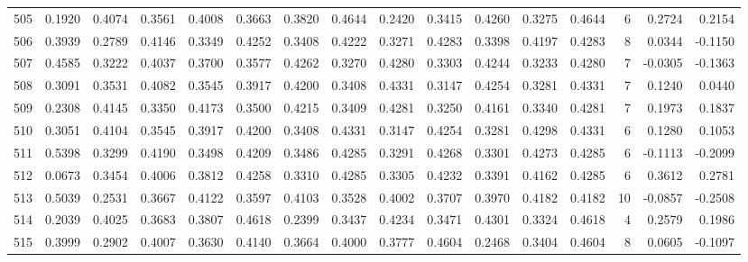 \begin{tabular}{lrrrrrrrrrrrrrrr}
505 &      0.1920 &  0.4074 &  0.3561 &  0.4008 &  0.3663 &  0.3820 &  0.4644 &  0.2420 &  0.3415 &  0.4260 &   0.3275 &     0.4644 &      6 &                    0.2724 &                     0.2154 \\
506 &      0.3939 &  0.2789 &  0.4146 &  0.3349 &  0.4252 &  0.3408 &  0.4222 &  0.3271 &  0.4283 &  0.3398 &   0.4197 &     0.4283 &      8 &                    0.0344 &                    -0.1150 \\
507 &      0.4585 &  0.3222 &  0.4037 &  0.3700 &  0.3577 &  0.4262 &  0.3270 &  0.4280 &  0.3303 &  0.4244 &   0.3233 &     0.4280 &      7 &                   -0.0305 &                    -0.1363 \\
508 &      0.3091 &  0.3531 &  0.4082 &  0.3545 &  0.3917 &  0.4200 &  0.3408 &  0.4331 &  0.3147 &  0.4254 &   0.3281 &     0.4331 &      7 &                    0.1240 &                     0.0440 \\
509 &      0.2308 &  0.4145 &  0.3350 &  0.4173 &  0.3500 &  0.4215 &  0.3409 &  0.4281 &  0.3250 &  0.4161 &   0.3340 &     0.4281 &      7 &                    0.1973 &                     0.1837 \\
510 &      0.3051 &  0.4104 &  0.3545 &  0.3917 &  0.4200 &  0.3408 &  0.4331 &  0.3147 &  0.4254 &  0.3281 &   0.4298 &     0.4331 &      6 &                    0.1280 &                     0.1053 \\
511 &      0.5398 &  0.3299 &  0.4190 &  0.3498 &  0.4209 &  0.3486 &  0.4285 &  0.3291 &  0.4268 &  0.3301 &   0.4273 &     0.4285 &      6 &                   -0.1113 &                    -0.2099 \\
512 &      0.0673 &  0.3454 &  0.4006 &  0.3812 &  0.4258 &  0.3310 &  0.4285 &  0.3305 &  0.4232 &  0.3391 &   0.4162 &     0.4285 &      6 &                    0.3612 &                     0.2781 \\
513 &      0.5039 &  0.2531 &  0.3667 &  0.4122 &  0.3597 &  0.4103 &  0.3528 &  0.4002 &  0.3707 &  0.3970 &   0.4182 &     0.4182 &     10 &                   -0.0857 &                    -0.2508 \\
514 &      0.2039 &  0.4025 &  0.3683 &  0.3807 &  0.4618 &  0.2399 &  0.3437 &  0.4234 &  0.3471 &  0.4301 &   0.3324 &     0.4618 &      4 &                    0.2579 &                     0.1986 \\
515 &      0.3999 &  0.2902 &  0.4007 &  0.3630 &  0.4140 &  0.3664 &  0.4000 &  0.3777 &  0.4604 &  0.2468 &   0.3404 &     0.4604 &      8 &                    0.0605 &                    -0.1097 \\

\end{tabular}
